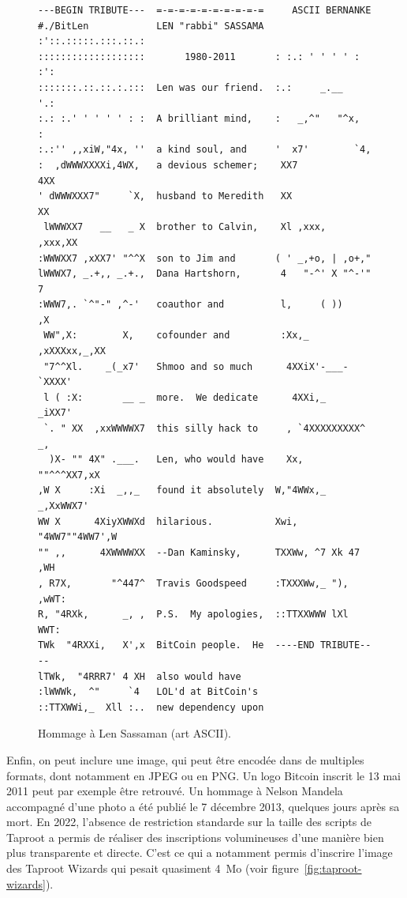 \begin{figure}[h]
  \begin{Verbatim}[fontsize=\footnotesize]
---BEGIN TRIBUTE---  =-=-=-=-=-=-=-=-=-=     ASCII BERNANKE
#./BitLen            LEN "rabbi" SASSAMA  :'::.:::::.:::.::.:
:::::::::::::::::::       1980-2011       : :.: ' ' ' ' : :':
:::::::.::.::.:.:::  Len was our friend.  :.:     _.__    '.:
:.: :.' ' ' ' ' : :  A brilliant mind,    :   _,^"   "^x,   :
:.:'' ,,xiW,"4x, ''  a kind soul, and     '  x7'        `4,
:  ,dWWWXXXXi,4WX,   a devious schemer;    XX7            4XX
' dWWWXXX7"     `X,  husband to Meredith   XX              XX
 lWWWXX7   __   _ X  brother to Calvin,    Xl ,xxx,   ,xxx,XX
:WWWXX7 ,xXX7' "^^X  son to Jim and       ( ' _,+o, | ,o+,"
lWWWX7, _.+,, _.+.,  Dana Hartshorn,       4   "-^' X "^-'" 7
:WWW7,. `^"-" ,^-'   coauthor and          l,     ( ))     ,X
 WW",X:        X,    cofounder and         :Xx,_ ,xXXXxx,_,XX
 "7^^Xl.    _(_x7'   Shmoo and so much      4XXiX'-___-`XXXX'
 l ( :X:       __ _  more.  We dedicate      4XXi,_   _iXX7'
 `. " XX  ,xxWWWWX7  this silly hack to     , `4XXXXXXXXX^ _,
  )X- "" 4X" .___.   Len, who would have    Xx,  ""^^^XX7,xX
,W X     :Xi  _,,_   found it absolutely  W,"4WWx,_ _,XxWWX7'
WW X      4XiyXWWXd  hilarious.           Xwi, "4WW7""4WW7',W
"" ,,      4XWWWWXX  --Dan Kaminsky,      TXXWw, ^7 Xk 47 ,WH
, R7X,       "^447^  Travis Goodspeed     :TXXXWw,_ "), ,wWT:
R, "4RXk,      _, ,  P.S.  My apologies,  ::TTXXWWW lXl WWT:
TWk  "4RXXi,   X',x  BitCoin people.  He  ----END TRIBUTE----
lTWk,  "4RRR7' 4 XH  also would have
:lWWWk,  ^"     `4   LOL'd at BitCoin's
::TTXWWi,_  Xll :..  new dependency upon
  \end{Verbatim}
  \caption{Hommage à Len Sassaman (art ASCII).}
  \label{fig:sassaman-tribute}
\end{figure}

Enfin, on peut inclure une image, qui peut être encodée dans de multiples formats, dont notamment en JPEG ou en PNG. Un logo Bitcoin inscrit le 13 mai 2011 peut par exemple être retrouvé. Un hommage à Nelson Mandela accompagné d'une photo a été publié le 7 décembre 2013, quelques jours après sa mort. En 2022, l'absence de restriction standarde sur la taille des scripts de Taproot a permis de réaliser des inscriptions volumineuses d'une manière bien plus transparente et directe. C'est ce qui a notamment permis d'inscrire l'image des Taproot Wizards qui pesait quasiment 4~Mo (voir figure~\ref{fig:taproot-wizards}).

